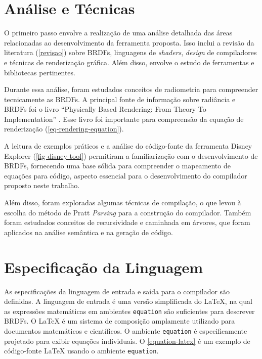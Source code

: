\section{Análise e Técnicas} \label{analise}


O primeiro passo envolve a realização de uma análise detalhada das áreas relacionadas ao desenvolvimento da ferramenta proposta. Isso inclui a revisão da literatura (\autoref{revisao}) sobre BRDFs, linguagens de \textit{shaders}, \textit{design} de compiladores e técnicas de renderização gráfica. Além disso, envolve o estudo de ferramentas e bibliotecas pertinentes.

Durante essa análise, foram estudados conceitos de radiometria para compreender tecnicamente as BRDFs. A principal fonte de informação sobre radiância e BRDFs foi o livro ``Physically Based Rendering: From Theory To Implementation'' \cite{pbr}. Esse livro foi importante para compreensão da equação de renderização (\autoref{eq-rendering-equation}).

A leitura de exemplos práticos e a análise do código-fonte da ferramenta Disney Explorer (\autoref{fig-disney-tool}) permitiram a familiarização com o desenvolvimento de BRDFs, fornecendo uma base sólida para compreender o mapeamento de equações para código, aspecto essencial para o desenvolvimento do compilador proposto neste trabalho.

Além disso, foram exploradas algumas técnicas de compilação, o que levou à escolha do método de Pratt \textit{Parsing} para a construção do compilador. Também foram estudados conceitos de recursividade e caminhada em árvores, que foram aplicados na análise semântica e na geração de código.


\section{Especificação da Linguagem}\label{especificacao-linguagem}

As especificações da linguagem de entrada e saída para o compilador são definidas. A linguagem de entrada é uma versão simplificada do \LaTeX{}, na qual as expressões matemáticas em ambientes \texttt{equation} são suficientes para descrever BRDFs. O \LaTeX{}  é um sistema de composição amplamente utilizado para documentos matemáticos e científicos. O ambiente \texttt{equation} é especificamente projetado para exibir equações individuais. O \autoref{equation-latex} é um exemplo de código-fonte \LaTeX{}  usando o ambiente \texttt{equation}.


